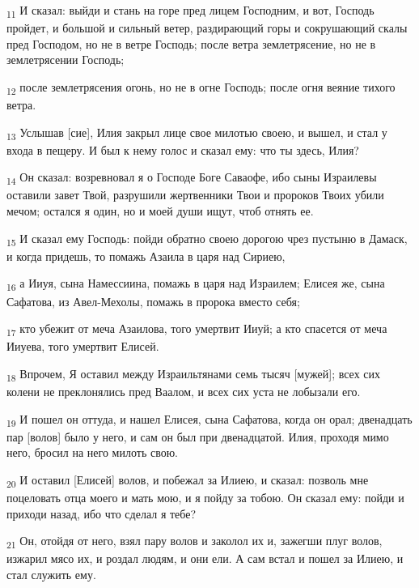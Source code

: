 \begin{tcolorbox}
\textsubscript{11} И сказал: выйди и стань на горе пред лицем Господним, и вот, Господь пройдет, и большой и сильный ветер, раздирающий горы и сокрушающий скалы пред Господом, но не в ветре Господь; после ветра землетрясение, но не в землетрясении Господь;
\end{tcolorbox}
\begin{tcolorbox}
\textsubscript{12} после землетрясения огонь, но не в огне Господь; после огня веяние тихого ветра.
\end{tcolorbox}
\begin{tcolorbox}
\textsubscript{13} Услышав [сие], Илия закрыл лице свое милотью своею, и вышел, и стал у входа в пещеру. И был к нему голос и сказал ему: что ты здесь, Илия?
\end{tcolorbox}
\begin{tcolorbox}
\textsubscript{14} Он сказал: возревновал я о Господе Боге Саваофе, ибо сыны Израилевы оставили завет Твой, разрушили жертвенники Твои и пророков Твоих убили мечом; остался я один, но и моей души ищут, чтоб отнять ее.
\end{tcolorbox}
\begin{tcolorbox}
\textsubscript{15} И сказал ему Господь: пойди обратно своею дорогою чрез пустыню в Дамаск, и когда придешь, то помажь Азаила в царя над Сириею,
\end{tcolorbox}
\begin{tcolorbox}
\textsubscript{16} а Ииуя, сына Намессиина, помажь в царя над Израилем; Елисея же, сына Сафатова, из Авел-Мехолы, помажь в пророка вместо себя;
\end{tcolorbox}
\begin{tcolorbox}
\textsubscript{17} кто убежит от меча Азаилова, того умертвит Ииуй; а кто спасется от меча Ииуева, того умертвит Елисей.
\end{tcolorbox}
\begin{tcolorbox}
\textsubscript{18} Впрочем, Я оставил между Израильтянами семь тысяч [мужей]; всех сих колени не преклонялись пред Ваалом, и всех сих уста не лобызали его.
\end{tcolorbox}
\begin{tcolorbox}
\textsubscript{19} И пошел он оттуда, и нашел Елисея, сына Сафатова, когда он орал; двенадцать пар [волов] было у него, и сам он был при двенадцатой. Илия, проходя мимо него, бросил на него милоть свою.
\end{tcolorbox}
\begin{tcolorbox}
\textsubscript{20} И оставил [Елисей] волов, и побежал за Илиею, и сказал: позволь мне поцеловать отца моего и мать мою, и я пойду за тобою. Он сказал ему: пойди и приходи назад, ибо что сделал я тебе?
\end{tcolorbox}
\begin{tcolorbox}
\textsubscript{21} Он, отойдя от него, взял пару волов и заколол их и, зажегши плуг волов, изжарил мясо их, и роздал людям, и они ели. А сам встал и пошел за Илиею, и стал служить ему.
\end{tcolorbox}
